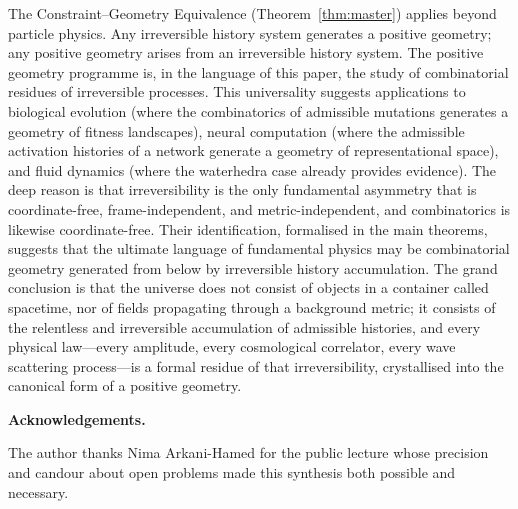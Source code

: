 \documentclass[11pt]{article}
\theoremstyle{plain}
\theoremstyle{definition}
\theoremstyle{remark}
\begin{document}
The Constraint--Geometry Equivalence (Theorem~\ref{thm:master}) applies beyond particle physics. Any irreversible history system generates a positive geometry; any positive geometry arises from an irreversible history system. The positive geometry programme is, in the language of this paper, the study of combinatorial residues of irreversible processes. This universality suggests applications to biological evolution (where the combinatorics of admissible mutations generates a geometry of fitness landscapes), neural computation (where the admissible activation histories of a network generate a geometry of representational space), and fluid dynamics (where the waterhedra case already provides evidence). The deep reason is that irreversibility is the only fundamental asymmetry that is coordinate-free, frame-independent, and metric-independent, and combinatorics is likewise coordinate-free. Their identification, formalised in the main theorems, suggests that the ultimate language of fundamental physics may be combinatorial geometry generated from below by irreversible history accumulation. The grand conclusion is that the universe does not consist of objects in a container called spacetime, nor of fields propagating through a background metric; it consists of the relentless and irreversible accumulation of admissible histories, and every physical law---every amplitude, every cosmological correlator, every wave scattering process---is a formal residue of that irreversibility, crystallised into the canonical form of a positive geometry.

\bigskip\noindent\textbf{Acknowledgements.}

The author thanks Nima Arkani-Hamed for the public lecture whose precision and candour about open problems made this synthesis both possible and necessary.

\newpage


\end{document}
